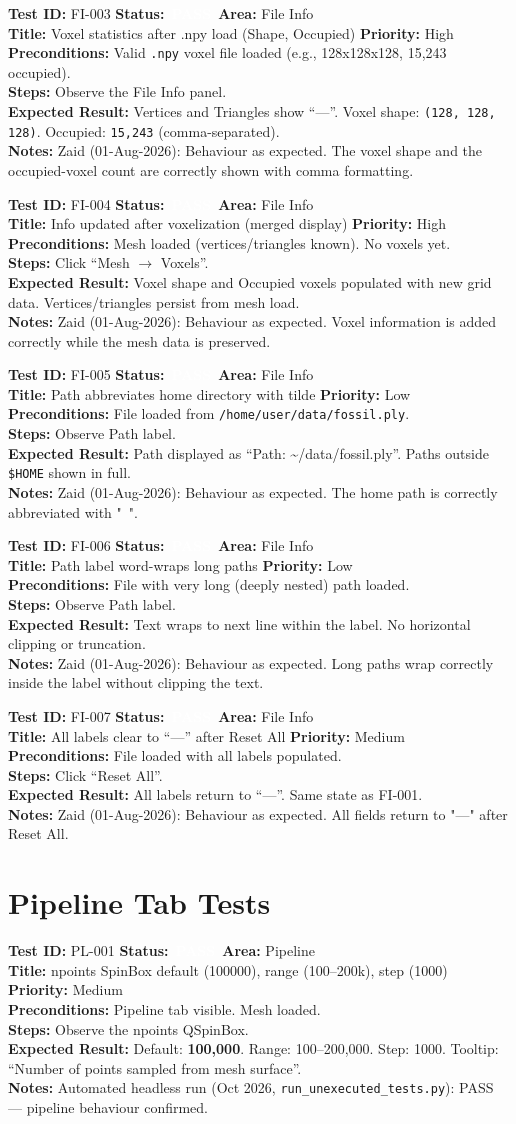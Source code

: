 \documentclass[12pt,a4paper]{article}
\newcommand{\statuspass}{\colorbox{statusgreen}{\textcolor{white}{\textbf{\,PASS\,}}}}
\newcommand{\testcase}[9]{%
  \smallskip
  \noindent\textbf{Test ID:} #1 \hfill \textbf{Status:} #2 \hfill \textbf{Area:} #3 \\
  \textbf{Title:} #4 \hfill \textbf{Priority:} #5 \\[0.3em]
  \textbf{Preconditions:} #6 \\[0.3em]
  \textbf{Steps:} #7 \\[0.3em]
  \textbf{Expected Result:} #8 \\
  \textbf{Notes:} #9
  \smallskip
}
\begin{document}
\testcase{FI-003}{\statuspass}{File Info}{Voxel statistics after .npy load (Shape, Occupied)}{High}{Valid \texttt{.npy} voxel file loaded (e.g., 128x128x128, 15,243 occupied).}{Observe the File Info panel.}{Vertices and Triangles show ``---''. Voxel shape: \texttt{(128, 128, 128)}. Occupied: \texttt{15,243} (comma-separated).}{Zaid (01-Aug-2026): Behaviour as expected. The voxel shape and the occupied-voxel count are correctly shown with comma formatting.}


\testcase{FI-004}{\statuspass}{File Info}{Info updated after voxelization (merged display)}{High}{Mesh loaded (vertices/triangles known). No voxels yet.}{Click ``Mesh $\rightarrow$ Voxels''.}{Voxel shape and Occupied voxels populated with new grid data. Vertices/triangles persist from mesh load.}{Zaid (01-Aug-2026): Behaviour as expected. Voxel information is added correctly while the mesh data is preserved.}


\testcase{FI-005}{\statuspass}{File Info}{Path abbreviates home directory with tilde}{Low}{File loaded from \texttt{/home/user/data/fossil.ply}.}{Observe Path label.}{Path displayed as ``Path: \textasciitilde/data/fossil.ply''. Paths outside \texttt{\$HOME} shown in full.}{Zaid (01-Aug-2026): Behaviour as expected. The home path is correctly abbreviated with "~".}


\testcase{FI-006}{\statuspass}{File Info}{Path label word-wraps long paths}{Low}{File with very long (deeply nested) path loaded.}{Observe Path label.}{Text wraps to next line within the label. No horizontal clipping or truncation.}{Zaid (01-Aug-2026): Behaviour as expected. Long paths wrap correctly inside the label without clipping the text.}


\testcase{FI-007}{\statuspass}{File Info}{All labels clear to ``---'' after Reset All}{Medium}{File loaded with all labels populated.}{Click ``Reset All''.}{All labels return to ``---''. Same state as FI-001.}{Zaid (01-Aug-2026): Behaviour as expected. All fields return to "---" after Reset All.}



\section{Pipeline Tab Tests}

\testcase{PL-001}{\statuspass}{Pipeline}{npoints SpinBox default (100000), range (100--200k), step (1000)}{Medium}{Pipeline tab visible. Mesh loaded.}{Observe the npoints QSpinBox.}{Default: \textbf{100,000}. Range: 100--200,000. Step: 1000. Tooltip: ``Number of points sampled from mesh surface''.}{Automated headless run (Oct 2026, \texttt{run\_unexecuted\_tests.py}): PASS --- pipeline behaviour confirmed.}
\end{document}
